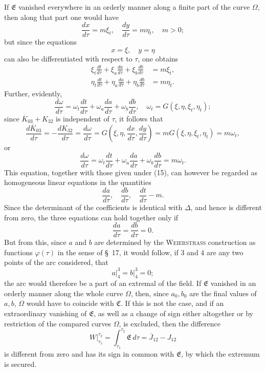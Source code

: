\documentclass[11pt,a4paper,leqno]{article}
\begin{document}
If $\mathfrak{E}$ vanished everywhere in an orderly manner along a finite part of the curve $\Omega$, then along that part one would have
\[
\frac{dx}{d\tau}=m\xi_t,
\quad
\frac{dy}{d\tau}=m\eta_t,
\quad
m>0;
\]
but since the equations
\[
x=\xi,
\quad
 y=\eta
\]
can also be differentiated with respect to $\tau$, one obtains
\begin{equation}\tag{15}
\begin{aligned}
\xi_t\frac{dt}{d\tau}+\xi_a\frac{da}{d\tau}+\xi_b\frac{db}{d\tau}&=m\xi_t,\\
\eta_t\frac{dt}{d\tau}+\eta_a\frac{da}{d\tau}+\eta_b\frac{db}{d\tau}&=m\eta_t.
\end{aligned}
\end{equation}
Further, evidently,
\[
\frac{d\omega}{d\tau}=\omega_t\frac{dt}{d\tau}+\omega_a\frac{da}{d\tau}+\omega_b\frac{db}{d\tau},
\quad
\omega_t=G(\xi,\eta,\xi_t,\eta_t);
\]
since $\overline{K}_{03}+K_{32}$ is independent of $\tau$, it follows that
\[
\frac{d\overline{K}_{03}}{d\tau}=-\frac{dK_{32}}{d\tau}=\frac{d\omega}{d\tau}=G\left(\xi,\eta,\frac{dx}{d\tau},\frac{dy}{d\tau}\right)
=mG(\xi,\eta,\xi_t,\eta_t)=m\omega_t,
\]
or
\[
\frac{d\omega}{d\tau}=\omega_t\frac{dt}{d\tau}+\omega_a\frac{da}{d\tau}+\omega_b\frac{db}{d\tau}=m\omega_t.
\]
This equation, together with those given under (15), can however be regarded as homogeneous linear equations in the quantities
\[
\frac{da}{d\tau},
\quad
\frac{db}{d\tau},
\quad
\frac{dt}{d\tau}-m.
\]
Since the determinant of the coefficients is identical with $\Delta$, and hence is different from zero, the three equations can hold together only if
\[
\frac{da}{d\tau}=\frac{db}{d\tau}=0.
\]
But from this, since $a$ and $b$ are determined by the \textsc{Weierstrass} construction as functions $\varphi(\tau)$ in the sense of \S~17, it would follow, if 3 and 4 are any two points of the arc considered, that
\[
a\bigg|_4^3=b\bigg|_4^3=0;
\]
the arc would therefore be a part of an extremal of the field. If $\mathfrak{E}$ vanished in an orderly manner along the whole curve $\Omega$, then, since $a_0,b_0$ are the final values of $a,b$, $\Omega$ would have to coincide with $\mathfrak{C}$. If this is not the case, and if an extraordinary vanishing of $\mathfrak{E}$, as well as a change of sign either altogether or by restriction of the compared curves $\Omega$, is excluded, then the difference
\[
W\bigg|_{\tau_1}^{\tau_2}=\int_{\tau_1}^{\tau_2}\mathfrak{E}\,d\tau=\overline{J}_{12}-J_{12}
\]
is different from zero and has its sign in common with $\mathfrak{E}$, by which the extremum is secured.
\end{document}
